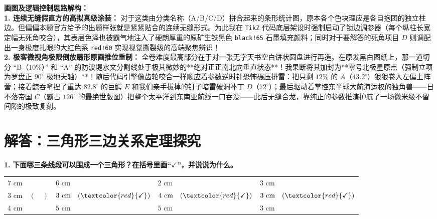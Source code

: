 \documentclass[12pt, a4paper]{ctexrep}
\begin{document}
\vspace{0.6cm}

{\small\color{blue!70!black}
\textbf{画图及逻辑控制思路解构：}\\
\textbf{1. 连续无缝假直方的高拟真级涂装：} 对于这类由分类名称（A/B/C/D）拼合起来的条形统计图，原本各个色块理应是各自抱团的独立柱边。但偏偏本题官方给予的出题样张就是紧紧贴合的连续无缝形式。为此我在 \texttt{TikZ} 代码底层架设时强制启动了锁边调参器（每个纵柱长宽定幅无死角咬合），其表层色泽也被霸气地注入了硬朗厚重的原矿生铁黑色 \texttt{black!65} 石墨填充颜料；同时对于要解答的死角项目 $D$ 则调配出一身极度扎眼的大红色系 \texttt{red!60} 实现视觉撕裂级的高端聚焦辨识！\\
\textbf{2. 极客微视角极限倒放扇形原画推位重制：} 全卷难度最高部分在于对一张无字天书空白饼状圆盘进行再造。在原发黑白图纸上，那一道切分 “B（$10\%$）” 和 “A” 的防波堤水文分割线处于极其微妙的**绝对正正南北向垂直状态**！我果断将其加封为**零号北极星原点（强制立项为罗盘正 $90^\circ$ 极地天轴）**！随后代码引擎像齿轮咬合一样顺应着参数逆时针恐怖碾压排雷：把只剩 $12\%$ 的 $A$（$43.2^\circ$）狠狠卷入左偏上阵营；接着鲸吞拿捏了重达 $82.8^\circ$ 的巨鳄 $E$ 和我们亲手拔掉的钉子暗雷破洞补丁 $D$（$72^\circ$）；最后驱动着掌控东半球大航海运权的独角兽——日不落帝国 $C$（霸占 $126^\circ$ 的最绝世版图）把整个太平洋到东南亚航线一口吞没——此后无缝合龙，靠纯正的参数推演护航了一场微米级不留间隙的极致复刻。
}

\newpage

\section{解答：三角形三边关系定理探究}

\vspace{0.6cm}

\textbf{\LARGE 1.} \textbf{下面哪三条线段可以围成一个三角形？在括号里画“$\checkmark$”，并说说为什么。}

\vspace{0.4cm}

\begin{center}
\renewcommand{\arraystretch}{1.5}
\setlength{\tabcolsep}{15pt}
\begin{tabular}{llll}
$7\text{ cm}$ & $6\text{ cm}$ & $2\text{ cm}$ & $3\text{ cm}$ \\
$3\text{ cm} \quad (\quad)$ & $3\text{ cm} \quad (\textcolor{red}{\checkmark})$ & $4\text{ cm} \quad (\textcolor{red}{\checkmark})$ & $3\text{ cm} \quad (\textcolor{red}{\checkmark})$ \\
$4\text{ cm}$ & $5\text{ cm}$ & $5\text{ cm}$ & $3\text{ cm}$ \\
\end{tabular}
\end{center}
\end{document}
